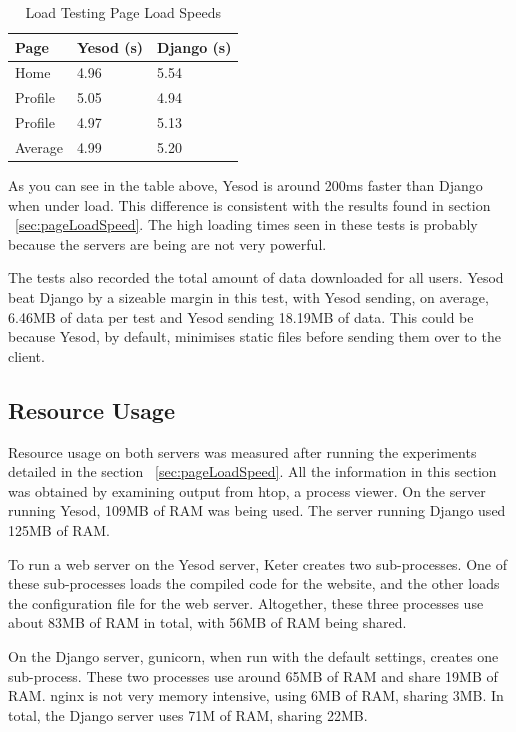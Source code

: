 \begin{table}[H]
	\caption{Load Testing Page Load Speeds}
	\begin{center}
		\begin{tabular}{ | l | l | l |}
			\hline
			Page & Yesod (s) & Django (s) \\
			\hline
			Home & 4.96 & 5.54 \\
			Profile & 5.05 & 4.94 \\
			Profile & 4.97 & 5.13 \\
			Average & 4.99 & 5.20 \\
			\hline
		\end{tabular}
	\end{center}
	\label{tab:loadTests}
\end{table}

As you can see in the table above, Yesod is around 200ms faster than
Django when under load. This difference is consistent with the results
found in section ~\ref{sec:pageLoadSpeed}. The high loading times
seen in these tests is probably because the servers are being are not
very powerful.

The tests also recorded the total amount of data downloaded for all
users. Yesod beat Django by a sizeable margin in this test, with
Yesod sending, on average, 6.46MB of data per test and Yesod
sending 18.19MB of data. This could be because Yesod, by default, 
minimises static files before sending them over to the client.

\subsection{Resource Usage}

Resource usage on both servers was measured after running the experiments
detailed in the section ~\ref{sec:pageLoadSpeed}. All the information in 
this section was obtained by examining output from htop, a process viewer. 
On the server running Yesod, 109MB of RAM was being used. The server running 
Django used 125MB of RAM.

To run a web server on the Yesod server, Keter creates two sub-processes.
One of these sub-processes loads the compiled code for the website, and the
other loads the configuration file for the web server. Altogether, these
three processes use about 83MB of RAM in total, with 56MB of RAM being
shared.

On the Django server, gunicorn, when run with the default settings, creates
one sub-process. These two processes use around 65MB of RAM and share 19MB
of RAM. nginx is not very memory intensive, using 6MB of RAM, sharing 3MB.
In total, the Django server uses 71M of RAM, sharing 22MB.

